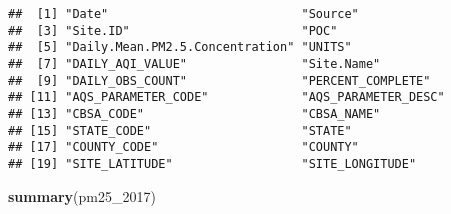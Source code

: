 \documentclass[]{article}
\newenvironment{Shaded}{\begin{snugshade}}{\end{snugshade}}
\newcommand{\KeywordTok}[1]{\textcolor[rgb]{0.13,0.29,0.53}{\textbf{#1}}}
\newcommand{\DecValTok}[1]{\textcolor[rgb]{0.00,0.00,0.81}{#1}}
\newcommand{\NormalTok}[1]{#1}
\begin{document}
\begin{verbatim}
##  [1] "Date"                           "Source"                        
##  [3] "Site.ID"                        "POC"                           
##  [5] "Daily.Mean.PM2.5.Concentration" "UNITS"                         
##  [7] "DAILY_AQI_VALUE"                "Site.Name"                     
##  [9] "DAILY_OBS_COUNT"                "PERCENT_COMPLETE"              
## [11] "AQS_PARAMETER_CODE"             "AQS_PARAMETER_DESC"            
## [13] "CBSA_CODE"                      "CBSA_NAME"                     
## [15] "STATE_CODE"                     "STATE"                         
## [17] "COUNTY_CODE"                    "COUNTY"                        
## [19] "SITE_LATITUDE"                  "SITE_LONGITUDE"
\end{verbatim}

\begin{Shaded}
\begin{Highlighting}[]
\KeywordTok{summary}\NormalTok{(pm25_}\DecValTok{2017}\NormalTok{)}
\end{Highlighting}
\end{Shaded}
\end{document}
